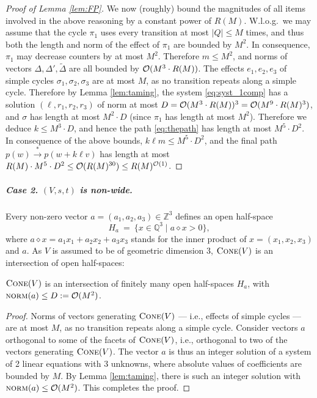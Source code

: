 \documentclass[a4paper, UKenglish, cleveref, autoref, thm-restate]{lipics-v2021}
\newcommand{\Z}{\mathbb{Z}}
\newcommand{\Q}{\mathbb{Q}}
\newcommand{\set}[1]{\{#1\}}
\newcommand{\setof}[2]{\set{#1 \mid #2}}
\newcommand{\card}[1]{\left|#1\right|}
\newcommand{\trans}[1]{\stackrel{#1}{\longrightarrow}}
\newcommand{\tran}{\trans{*}}
\newcommand{\norm}{\textsc{norm}}
\newcommand{\OO}{{\cal O}}
\newcommand{\para}[1]{\vspace{-3mm}\subparagraph*{\bf #1.}}
\newcommand{\Wlog}{W.l.o.g.~}
\newcommand{\cone}[1]{\textsc{Cone}(#1)}
\newcommand{\innprod}[2]{#1 \diamond #2} \newcommand{\pair}[2]{#1_{#2}}
\begin{document}
\begin{proof}[Proof of Lemma \ref{lem:FP}]
\smallskip

We now (roughly) bound the magnitudes of all items involved in the above reasoning
by a constant power of $R(M)$.
\Wlog we may assume that the cycle $\pi_1$ uses every transition at most $\card Q\leq M$ times,
and thus both the length and norm of the effect of $\pi_1$ are bounded by $M^2$.
In consequence, $\pi_1$ may decrease counters by at most $M^2$.
Therefore $m\leq M^2$, and
norms of vectors $\Delta, \Delta', \widetilde\Delta$ are all bounded by 
$\OO(M^3\cdot R(M))$. The effects $e_1, e_2, e_3$ of simple cycles $\sigma_1, \sigma_2, \sigma_3$ are at most $M$, 
as no transition repeats along a simple cycle.
Therefore by Lemma \ref{lem:taming}, the system \eqref{eq:syst_1comp} has a solution $(\ell, r_1, r_2, r_3)$ 
of norm at most $D=\OO(M^3\cdot R(M))^3 = \OO(M^9 \cdot R(M)^{3})$, 
and $\sigma$ has length at most $M^2 \cdot D$
(since $\pi_1$ has length at most $M^2$). Therefore we deduce $k\leq M^3 \cdot D$, and hence
the path \eqref{eq:thepath} has length at most $M^5 \cdot D^2$. In consequence of the above bounds, $k \ell m \leq M^5 \cdot D^2$, and the final path $p(w) \tran p(w+ k \ell v)$ has length at most 
$R(M) \cdot M^5 \cdot D^2
\leq \OO(R(M)^{30})\leq R(M)^{\OO(1)}$.
\end{proof}



\para{Case 2. $(V, s, t)$ is non-wide}

Every non-zero vector $a=(a_1, a_2, a_3)\in\Z^3$ defines an open half-space
\[
H_a \ = \ \setof{x\in\Q^3}{\innprod a x > 0},
\]
where $\innprod a x = a_1 x_1 + a_2 x_2 + a_3 x_3$ stands for the inner product of 
$x =(x_1, x_2, x_3)$ and $a$.
As $V$ is assumed to be of geometric dimension 3,
$\cone V$  is an intersection of open half-spaces:
\begin{claim} \label{claim:a}
$\cone V$ is an intersection of finitely many open half-spaces $H_a$, with $\norm(a) \leq D := \OO(M^2)$.
\end{claim}


\begin{proof}
Norms of vectors generating $\cone V$ --- i.e., effects of simple cycles --- are at most $M$, 
as no transition repeats along a simple cycle.
Consider vectors $a$ orthogonal to some of the facets of $\cone V$, i.e.,
orthogonal to two of the vectors generating $\cone V$. 
The vector $a$ is thus an integer solution of a system of 2 linear equations with 3 unknowns,
where absolute values of coefficients are bounded by $M$.
By Lemma \ref{lem:taming}, there is such an integer solution with $\norm(a)\leq \OO(M^2)$.
This completes the proof.
\end{proof}
\end{document}

